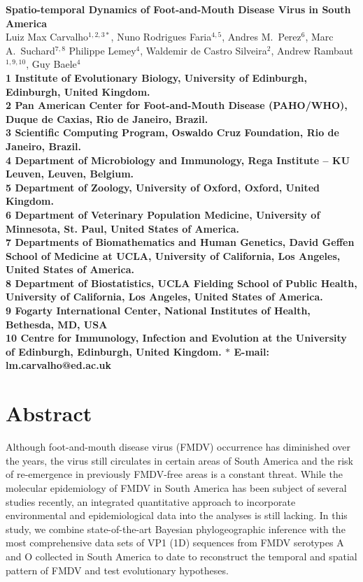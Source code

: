 \documentclass[10pt]{article}
\date{}
\begin{document}
\begin{flushleft}
{\Large
\textbf{Spatio-temporal Dynamics of Foot-and-Mouth Disease Virus in South America}
}
\\
Luiz Max Carvalho$^{1,2,3\ast}$,
Nuno Rodrigues Faria$^{4,5}$,
Andres M.~Perez$^{6}$,
Marc A.~Suchard$^{7,8}$
Philippe Lemey$^{4}$,
Waldemir de Castro Silveira$^{2}$,
Andrew Rambaut$^{1,9,10}$,
Guy Baele$^{4}$
\\
\bf{1} Institute of Evolutionary Biology, University of Edinburgh, Edinburgh, United Kingdom.\\
\bf{2} Pan American Center for Foot-and-Mouth Disease (PAHO/WHO), Duque de Caxias, Rio de Janeiro, Brazil.\\
\bf{3} Scientific Computing Program, Oswaldo Cruz Foundation, Rio de Janeiro, Brazil.\\
\bf{4} Department of Microbiology and Immunology, Rega Institute -- KU Leuven, Leuven, Belgium.\\
\bf{5} Department of Zoology, University of Oxford, Oxford, United Kingdom.\\
\bf{6} Department of Veterinary Population Medicine, University of Minnesota, St. Paul, United States of America.\\
\bf{7} Departments of Biomathematics and Human Genetics, David Geffen School of Medicine at UCLA, University of California, Los Angeles,  United States of America.\\
\bf{8} Department of Biostatistics, UCLA Fielding School of Public Health, University of California, Los Angeles,  United States of America.\\
\bf{9}  Fogarty International Center, National Institutes of Health, Bethesda, MD, USA\\
\bf{10} Centre for Immunology, Infection and Evolution at the University of Edinburgh, Edinburgh, United Kingdom.
$\ast$ E-mail: lm.carvalho@ed.ac.uk
\end{flushleft}
\section*{Abstract}

Although foot-and-mouth disease virus (FMDV) occurrence has diminished over the years, the virus still circulates in certain areas of South America and the risk of re-emergence in previously FMDV-free areas is a constant threat.
While the molecular epidemiology of FMDV in South America has been subject of several studies recently, an integrated quantitative approach to incorporate environmental and epidemiological data into the analyses is still lacking.
In this study, we combine state-of-the-art Bayesian phylogeographic inference with the most comprehensive data sets of VP1 (1D) sequences from FMDV serotypes A and O collected in South America to date  to  reconstruct the temporal and spatial pattern of FMDV and test evolutionary hypotheses.
\end{document}
